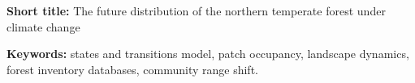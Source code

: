 \begin{titlingpage}
		\maketitle

		\begin{flushleft}

			\textbf{Short title:} The future distribution of the northern temperate forest under climate change

			\textbf{Keywords:} states and transitions model, patch occupancy, landscape dynamics, forest inventory databases, community range shift.
		\end{flushleft}
	\end{titlingpage}
